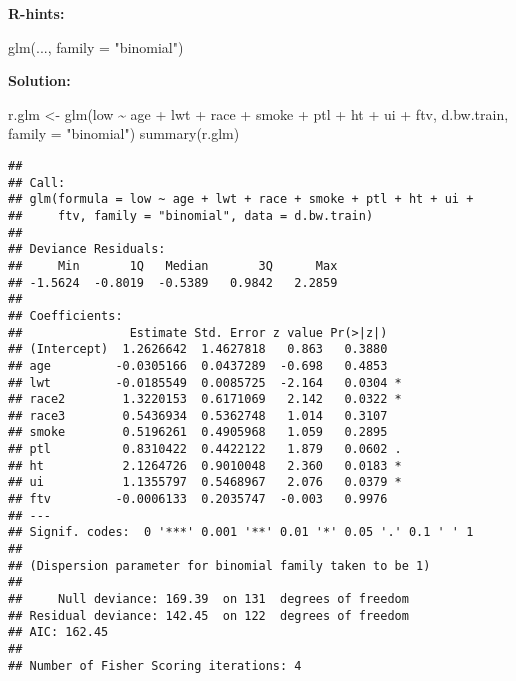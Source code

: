 \documentclass[
]{article}
\newenvironment{Shaded}{\begin{snugshade}}{\end{snugshade}}
\newcommand{\AttributeTok}[1]{\textcolor[rgb]{0.77,0.63,0.00}{#1}}
\newcommand{\FunctionTok}[1]{\textcolor[rgb]{0.00,0.00,0.00}{#1}}
\newcommand{\NormalTok}[1]{#1}
\newcommand{\OtherTok}[1]{\textcolor[rgb]{0.56,0.35,0.01}{#1}}
\newcommand{\SpecialCharTok}[1]{\textcolor[rgb]{0.00,0.00,0.00}{#1}}
\newcommand{\StringTok}[1]{\textcolor[rgb]{0.31,0.60,0.02}{#1}}
\begin{document}
\textbf{R-hints:}

\begin{Shaded}
\begin{Highlighting}[]
\FunctionTok{glm}\NormalTok{(..., }\AttributeTok{family =} \StringTok{"binomial"}\NormalTok{)}
\end{Highlighting}
\end{Shaded}

\textbf{Solution:}

\begin{Shaded}
\begin{Highlighting}[]
\NormalTok{r.glm }\OtherTok{\textless{}{-}} \FunctionTok{glm}\NormalTok{(low }\SpecialCharTok{\textasciitilde{}}\NormalTok{ age }\SpecialCharTok{+}\NormalTok{ lwt }\SpecialCharTok{+}\NormalTok{ race }\SpecialCharTok{+}\NormalTok{ smoke }\SpecialCharTok{+}\NormalTok{ ptl }\SpecialCharTok{+}\NormalTok{ ht }\SpecialCharTok{+}\NormalTok{ ui }\SpecialCharTok{+}\NormalTok{ ftv, d.bw.train,}
    \AttributeTok{family =} \StringTok{"binomial"}\NormalTok{)}
\FunctionTok{summary}\NormalTok{(r.glm)}
\end{Highlighting}
\end{Shaded}

\begin{verbatim}
## 
## Call:
## glm(formula = low ~ age + lwt + race + smoke + ptl + ht + ui + 
##     ftv, family = "binomial", data = d.bw.train)
## 
## Deviance Residuals: 
##     Min       1Q   Median       3Q      Max  
## -1.5624  -0.8019  -0.5389   0.9842   2.2859  
## 
## Coefficients:
##               Estimate Std. Error z value Pr(>|z|)  
## (Intercept)  1.2626642  1.4627818   0.863   0.3880  
## age         -0.0305166  0.0437289  -0.698   0.4853  
## lwt         -0.0185549  0.0085725  -2.164   0.0304 *
## race2        1.3220153  0.6171069   2.142   0.0322 *
## race3        0.5436934  0.5362748   1.014   0.3107  
## smoke        0.5196261  0.4905968   1.059   0.2895  
## ptl          0.8310422  0.4422122   1.879   0.0602 .
## ht           2.1264726  0.9010048   2.360   0.0183 *
## ui           1.1355797  0.5468967   2.076   0.0379 *
## ftv         -0.0006133  0.2035747  -0.003   0.9976  
## ---
## Signif. codes:  0 '***' 0.001 '**' 0.01 '*' 0.05 '.' 0.1 ' ' 1
## 
## (Dispersion parameter for binomial family taken to be 1)
## 
##     Null deviance: 169.39  on 131  degrees of freedom
## Residual deviance: 142.45  on 122  degrees of freedom
## AIC: 162.45
## 
## Number of Fisher Scoring iterations: 4
\end{verbatim}
\end{document}
